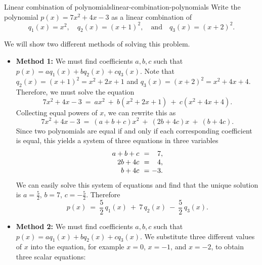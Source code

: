 \begin{example}{Linear combination of polynomials}{linear-combination-polynomials}
  Write the polynomial $p(x) = 7x^2 + 4x - 3$ as a linear combination%
   of
  \begin{equation*}
    q_1(x) = x^2,\quad
    q_2(x) = (x+1)^2,\quad\mbox{and}\quad
    q_3(x) = (x+2)^2.
  \end{equation*}
\end{example}

\begin{solution}
  We will show two different methods of solving this problem.
  \begin{itemize}
  \item \textbf{Method 1:} We must find coefficients $a,b,c$ such that
    $p(x) = aq_1(x) + bq_2(x) + cq_3(x)$.  Note that
    $q_2(x) = (x+1)^2 = x^2 + 2x + 1$ and
    $q_3(x) = (x+2)^2 = x^2 + 4x + 4$. Therefore, we must solve the
    equation
    \begin{equation*}
      7x^2 + 4x - 3 ~=~ ax^2 ~+~ b(x^2 + 2x + 1) ~+~ c(x^2 + 4x + 4).
    \end{equation*}
    Collecting equal powers of $x$, we can rewrite this as
    \begin{equation*}
      7x^2 + 4x - 3 ~=~ (a+b+c)x^2 ~+~ (2b+4c)x ~+~ (b+4c).
    \end{equation*}
    Since two polynomials are equal if and only if each corresponding
    coefficient is equal, this yields a system of three equations in
    three variables
    \begin{equation*}
      \begin{array}{r@{~~}c@{~}r}
        a+b+c &=& 7, \\
        2b+4c &=& 4, \\
        b+4c &=& -3.
      \end{array}
    \end{equation*}      
    We can easily solve this system of equations and find that the
    unique solution is $a=\frac{5}{2}$, $b=7$,
    $c=-\frac{5}{2}$. Therefore
    \begin{equation*}
      p(x) ~=~ \frac{5}{2}\,q_1(x) ~+~ 7\,q_2(x) ~-~ \frac{5}{2}\,q_3(x).
    \end{equation*}
  \item\textbf{Method 2:} We must find coefficients $a,b,c$ such that
    $p(x) = aq_1(x) + bq_2(x) + cq_3(x)$. We substitute three
    different values of $x$ into the equation, for example $x=0$,
    $x=-1$, and $x=-2$, to obtain three scalar equations:

\end{itemize}
\end{solution}
